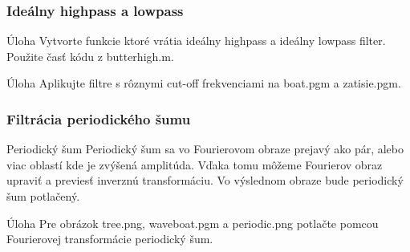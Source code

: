 \documentclass{beamer}
\begin{document}
\begin{frame}
\frametitle{Ideálny highpass a lowpass}
  \begin{block}{Úloha}
  Vytvorte funkcie ktoré vrátia ideálny highpass a ideálny lowpass filter. Použite časť kódu z butterhigh.m.
  \end{block}
  
  \begin{block}{Úloha}
  Aplikujte filtre s rôznymi cut-off frekvenciami na boat.pgm a zatisie.pgm.
  \end{block}
\end{frame}

\begin{frame}
\frametitle{Filtrácia periodického šumu}
  \begin{block}{Periodický šum}
  Periodický šum sa vo Fourierovom obraze prejavý ako pár, alebo viac oblastí kde je zvýšená amplitúda. Vďaka tomu môžeme Fourierov obraz upraviť a previesť inverznú transformáciu. Vo výslednom obraze bude periodický šum potlačený.
  \end{block}
  
  \begin{block}{Úloha}
  Pre obrázok tree.png, waveboat.pgm a periodic.png potlačte pomcou Fourierovej transformácie periodický šum.
  \end{block}
\end{frame}
\end{document}
